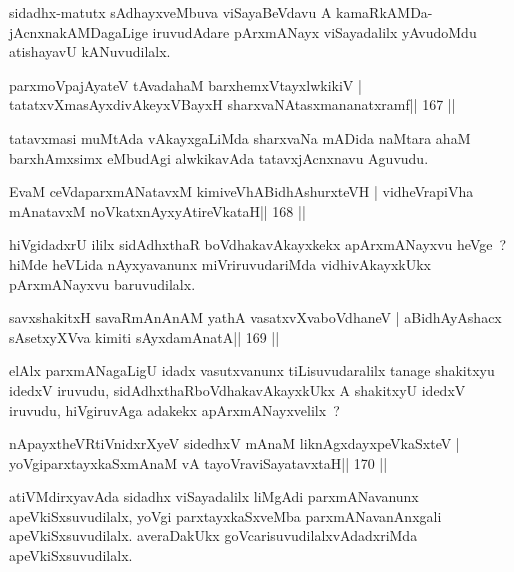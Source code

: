 \begin{artha}
sidadhx-matutx sAdhayxveMbuva viSayaBeVdavu A kamaRkAMDa-jAcnxnakAMDagaLige iruvudAdare pArxmANayx viSayadalilx yAvudoMdu atishayavU kANuvudilalx.
\end{artha}

\begin{shl}
parxmoVpajAyateV tAvadahaM barxhemxVtayxlwkikiV |
tatatxvXmasAyxdivAkeyxVBayxH sharxvaNAtasxmananatxramf\hfill || 167 ||
\end{shl}

\begin{artha}
tatavxmasi muMtAda vAkayxgaLiMda sharxvaNa mADida naMtara ahaM barxhAmxsimx eMbudAgi alwkikavAda tatavxjAcnxnavu Aguvudu.
\end{artha}

\begin{shl}
EvaM ceVdaparxmANatavxM kimiveVhABidhAshurxteVH |
vidheVrapiVha mAnatavxM noVkatxnAyxyAtireVkataH\hfill || 168 ||
\end{shl}

\begin{artha}
hiVgidadxrU ililx sidAdhxthaR boVdhakavAkayxkekx apArxmANayxvu heVge~? hiMde heVLida nAyxyavanunx miVriruvudariMda vidhivAkayxkUkx pArxmANayxvu baruvudilalx.
\end{artha}

\begin{shl}
savxshakitxH savaRmAnAnAM yathA vasatxvXvaboVdhaneV |
aBidhAyAshacx sA\s setxyXVva kimiti sAyxdamAnatA\hfill || 169 ||
\end{shl}

\begin{artha}
elAlx parxmANagaLigU idadx vasutxvanunx tiLisuvudaralilx tanage shakitxyu idedxV iruvudu, sidAdhxthaRboVdhakavAkayxkUkx A shakitxyU idedxV iruvudu, hiVgiruvAga adakekx apArxmANayxvelilx~? 
\end{artha}

\begin{shl}
nApayxtheVR\s tiVnidxrXyeV sidedhxV mAnaM liknAgxdayxpeVkaSxteV |
yoVgiparxtayxkaSxmAnaM vA tayoVraviSayatavxtaH\hfill || 170 ||
\end{shl}

\begin{artha}
atiVMdirxyavAda sidadhx viSayadalilx liMgAdi parxmANavanunx apeVkiSxsuvudilalx, yoVgi parxtayxkaSxveMba parxmANavanAnxgali apeVkiSxsuvudilalx. averaDakUkx goVcarisuvudilalxvAdadxriMda apeVkiSxsuvudilalx.
\end{artha}

